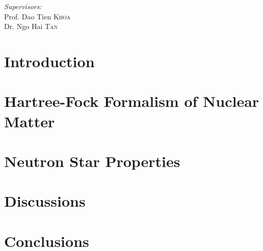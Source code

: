\documentclass[a4paper,12pt]{report}
\theoremstyle{plain}\newtheorem{ques}{Question}
\theoremstyle{definition}\newtheorem*{ans}{Answer}
\begin{document}
\begin{titlepage}
                \begin{minipage}[t]{0.3\textwidth}
                        \begin{flushright}
                                \emph{Supervisors:}\\
                                Prof. Dao Tien \textsc{Khoa}\\
                                Dr. Ngo Hai \textsc{Tan}
                        \end{flushright}
                \end{minipage}
                \vfill
                {\large \thedate\par}
        \end{titlepage}  
        
        \restoregeometry
        \tableofcontents

        \printglossary[title={List of Abbreviations}]
        \listoftables
        \listoffigures

        \captionsetup{width=0.9\linewidth}

        \chapter{Introduction}
        \label{chap:intro}
        

        \chapter{Hartree-Fock Formalism of Nuclear Matter}
        \label{chap:hf}
        

        \chapter{Neutron Star Properties}
        \label{chap:ns_prop}
        

        \chapter{Discussions}
        \label{chap:discuss}
        
        \chapter{Conclusions}
        \label{chap:conclusion}

        \clearpage
        
        
\end{document}
